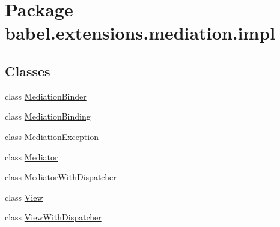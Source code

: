 \hypertarget{namespacebabel_1_1extensions_1_1mediation_1_1impl}{\section{Package babel.\-extensions.\-mediation.\-impl}
\label{namespacebabel_1_1extensions_1_1mediation_1_1impl}
}
\subsection*{Classes}
\begin{DoxyCompactItemize}
\item 
class \hyperlink{classbabel_1_1extensions_1_1mediation_1_1impl_1_1_mediation_binder}{Mediation\-Binder}
\item 
class \hyperlink{classbabel_1_1extensions_1_1mediation_1_1impl_1_1_mediation_binding}{Mediation\-Binding}
\item 
class \hyperlink{classbabel_1_1extensions_1_1mediation_1_1impl_1_1_mediation_exception}{Mediation\-Exception}
\item 
class \hyperlink{classbabel_1_1extensions_1_1mediation_1_1impl_1_1_mediator}{Mediator}
\item 
class \hyperlink{classbabel_1_1extensions_1_1mediation_1_1impl_1_1_mediator_with_dispatcher}{Mediator\-With\-Dispatcher}
\item 
class \hyperlink{classbabel_1_1extensions_1_1mediation_1_1impl_1_1_view}{View}
\item 
class \hyperlink{classbabel_1_1extensions_1_1mediation_1_1impl_1_1_view_with_dispatcher}{View\-With\-Dispatcher}
\end{DoxyCompactItemize}
